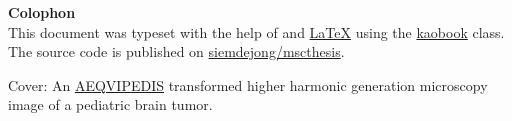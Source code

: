\mbox{}
\vfill
\textbf{Colophon} \\
This document was typeset with the help of \href{https://sourceforge.net/projects/koma-script/}{\KOMAScript} and \href{https://www.latex-project.org/}{\LaTeX} using the \href{https://github.com/fmarotta/kaobook/}{kaobook} class.
The source code is published on \href{https://github.com/siemdejong/mscthesis}{ siemdejong/mscthesis}.

\medskip
Cover: An \href{https://github.com/astoeckel/aequipedis}{AEQVIPEDIS} transformed higher harmonic generation microscopy image of a pediatric brain tumor.


